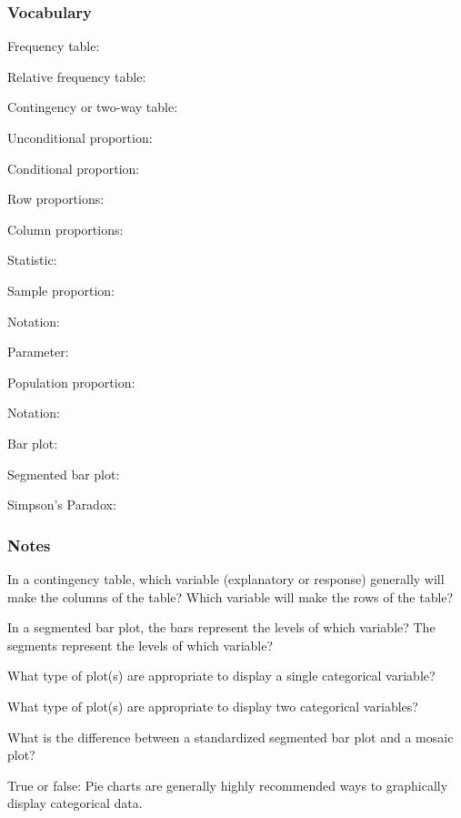 \documentclass[
]{report}
\newcommand{\rgs}{\vspace{12pt}} %
\newcommand{\rgi}{\hspace{24pt}}  %
\begin{document}

\hypertarget{vocabulary-3}{%
\subsubsection*{Vocabulary}\label{vocabulary-3}}

Frequency table:
\rgs

Relative frequency table:
\rgs

Contingency or two-way table:
\rgs

Unconditional proportion:
\rgs

Conditional proportion:
\rgs

\rgi Row proportions:
\rgs

\rgi Column proportions:
\rgs

Statistic:
\rgs

\rgi Sample proportion:
\rgs

\rgi \rgi Notation:
\rgs

Parameter:
\rgs

\rgi Population proportion:
\rgs

\rgi \rgi Notation:
\rgs

Bar plot:
\rgs

Segmented bar plot:
\rgs

Simpson's Paradox:
\rgs

\hypertarget{notes-4}{%
\subsubsection*{Notes}\label{notes-4}}

In a contingency table, which variable (explanatory or response) generally will make the columns of the table? Which variable will make the rows of the table?
\rgs

In a segmented bar plot, the bars represent the levels of which variable? The segments represent the levels of which variable?
\rgs

What type of plot(s) are appropriate to display a single categorical variable?
\rgs

What type of plot(s) are appropriate to display two categorical variables?
\rgs

What is the difference between a standardized segmented bar plot and a mosaic plot?
\rgs

True or false: Pie charts are generally highly recommended ways to graphically display categorical data.
\end{document}
